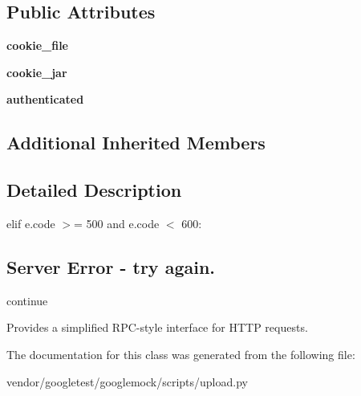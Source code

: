 \subsection*{Public Attributes}
\begin{DoxyCompactItemize}
\item 
{\bfseries cookie\+\_\+file}\hypertarget{classupload_1_1HttpRpcServer_ad5c1a730c030f9d3b5f70c2e0d8b9a1d}{}\label{classupload_1_1HttpRpcServer_ad5c1a730c030f9d3b5f70c2e0d8b9a1d}

\item 
{\bfseries cookie\+\_\+jar}\hypertarget{classupload_1_1HttpRpcServer_a1b9c9af7f0a46afd84a9d524782323bf}{}\label{classupload_1_1HttpRpcServer_a1b9c9af7f0a46afd84a9d524782323bf}

\item 
{\bfseries authenticated}\hypertarget{classupload_1_1HttpRpcServer_aaa356e2491537dd0d4bfc5b1bb0fec96}{}\label{classupload_1_1HttpRpcServer_aaa356e2491537dd0d4bfc5b1bb0fec96}

\end{DoxyCompactItemize}
\subsection*{Additional Inherited Members}


\subsection{Detailed Description}
elif e.\+code $>$= 500 and e.\+code $<$ 600\+: \subsection*{Server Error -\/ try again.}

continue \begin{DoxyVerb}Provides a simplified RPC-style interface for HTTP requests.\end{DoxyVerb}
 

The documentation for this class was generated from the following file\+:\begin{DoxyCompactItemize}
\item 
vendor/googletest/googlemock/scripts/upload.\+py\end{DoxyCompactItemize}

